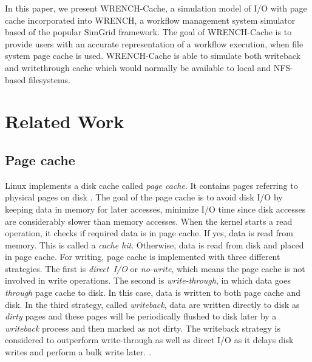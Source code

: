 \documentclass[conference]{IEEEtran}
\begin{document}
        In this paper, we present WRENCH-Cache, a simulation model of I/O with page
        cache incorporated into WRENCH, a workflow management system simulator based of
        the popular SimGrid framework. The goal of WRENCH-Cache is to provide users
        with an accurate representation of a workflow execution, when file system page
        cache is used. WRENCH-Cache is able to simulate both writeback and writethrough
        cache which would normally be available to local and NFS-based filesystems.
		
    \section{Related Work}        
    \label{relatedwork}    
        
        \subsection{Page cache}                            
            
            Linux implements a disk cache called \textit{page cache}. 
            It contains pages referring to physical pages on disk \cite{linuxdev3rd2010}.
            The goal of the page cache is to avoid disk I/O by keeping data in memory 
            for later accesses, minimize I/O time since disk accesses are considerably 
            slower than memory accesses.
            When the kernel starts a read operation, it checks if required data is in page cache.
            If yes, data is read from memory. This is called a \textit{cache hit}. 
            Otherwise, data is read from disk and placed in page cache.
            For writing, page cache is implemented with three different strategies. 
            The first is \textit{direct~I/O} or \textit{no-write}, which means the page cache 
            is not involved in write operations. 
            The second is \textit{write-through}, in which data goes \textit{through} 
            page cache to disk. In this case, data is written to both page cache and disk. 
            In the third strategy, called \textit{writeback}, data are written directly 
            to disk as \textit{dirty} pages and these pages will be periodically flushed 
            to disk later by a \textit{writeback} process and then marked as not dirty. 
            The writeback strategy is considered to outperform write-through as well as 
            direct I/O as it delays disk writes and perform a bulk write later.
            \cite{linuxdev3rd2010}. 
            
\end{document}
